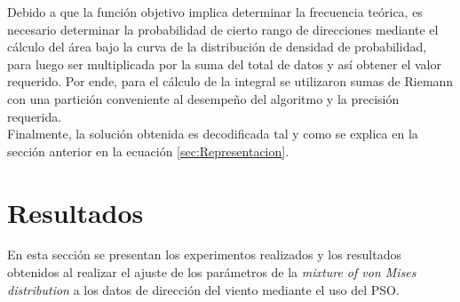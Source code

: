 Debido a que la función objetivo implica determinar la frecuencia teórica, es necesario determinar la probabilidad
de cierto rango de direcciones mediante el cálculo del área bajo la curva de la distribución de densidad de probabilidad, para luego ser multiplicada por la suma del total de datos y así obtener el valor requerido. Por ende, para el cálculo de la integral se utilizaron sumas de Riemann con una partición conveniente al desempeño del algoritmo y la precisión requerida.\\
Finalmente, la solución obtenida es decodificada tal y como se explica en la sección anterior en la ecuación \ref{sec:Representacion}.\\

\section{Resultados}\label{sec:Resultados_Dir}
En esta sección se presentan los experimentos realizados y los resultados obtenidos al realizar el ajuste de los parámetros de la \emph{mixture of von Mises distribution} a los datos de dirección del viento mediante el uso del PSO.
